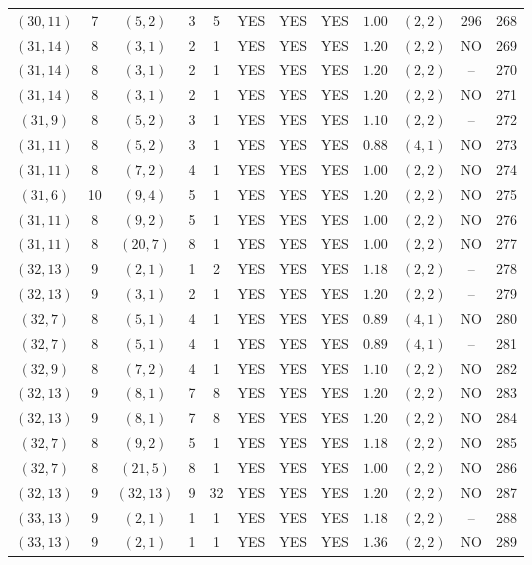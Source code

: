 \begin{longtable}{|c|c|c|c|c|c|c|c|c|c|c|c|}
$(30,11)$ & 7 & $(5,2)$ & 3 & 5 & YES & YES & YES & $1.00$ & $(2,2)$ & 296 & 268\\
$(31,14)$ & 8 & $(3,1)$ & 2 & 1 & YES & YES & YES & $1.20$ & $(2,2)$ & NO & 269\\
$(31,14)$ & 8 & $(3,1)$ & 2 & 1 & YES & YES & YES & $1.20$ & $(2,2)$ & -- & 270\\
$(31,14)$ & 8 & $(3,1)$ & 2 & 1 & YES & YES & YES & $1.20$ & $(2,2)$ & NO & 271\\
$(31,9)$ & 8 & $(5,2)$ & 3 & 1 & YES & YES & YES & $1.10$ & $(2,2)$ & -- & 272\\
$(31,11)$ & 8 & $(5,2)$ & 3 & 1 & YES & YES & YES & $0.88$ & $(4,1)$ & NO & 273\\
$(31,11)$ & 8 & $(7,2)$ & 4 & 1 & YES & YES & YES & $1.00$ & $(2,2)$ & NO & 274\\
$(31,6)$ & 10 & $(9,4)$ & 5 & 1 & YES & YES & YES & $1.20$ & $(2,2)$ & NO & 275\\
$(31,11)$ & 8 & $(9,2)$ & 5 & 1 & YES & YES & YES & $1.00$ & $(2,2)$ & NO & 276\\
$(31,11)$ & 8 & $(20,7)$ & 8 & 1 & YES & YES & YES & $1.00$ & $(2,2)$ & NO & 277\\
$(32,13)$ & 9 & $(2,1)$ & 1 & 2 & YES & YES & YES & $1.18$ & $(2,2)$ & -- & 278\\
$(32,13)$ & 9 & $(3,1)$ & 2 & 1 & YES & YES & YES & $1.20$ & $(2,2)$ & -- & 279\\
$(32,7)$ & 8 & $(5,1)$ & 4 & 1 & YES & YES & YES & $0.89$ & $(4,1)$ & NO & 280\\
$(32,7)$ & 8 & $(5,1)$ & 4 & 1 & YES & YES & YES & $0.89$ & $(4,1)$ & -- & 281\\
$(32,9)$ & 8 & $(7,2)$ & 4 & 1 & YES & YES & YES & $1.10$ & $(2,2)$ & NO & 282\\
$(32,13)$ & 9 & $(8,1)$ & 7 & 8 & YES & YES & YES & $1.20$ & $(2,2)$ & NO & 283\\
$(32,13)$ & 9 & $(8,1)$ & 7 & 8 & YES & YES & YES & $1.20$ & $(2,2)$ & NO & 284\\
$(32,7)$ & 8 & $(9,2)$ & 5 & 1 & YES & YES & YES & $1.18$ & $(2,2)$ & NO & 285\\
$(32,7)$ & 8 & $(21,5)$ & 8 & 1 & YES & YES & YES & $1.00$ & $(2,2)$ & NO & 286\\
$(32,13)$ & 9 & $(32,13)$ & 9 & 32 & YES & YES & YES & $1.20$ & $(2,2)$ & NO & 287\\
$(33,13)$ & 9 & $(2,1)$ & 1 & 1 & YES & YES & YES & $1.18$ & $(2,2)$ & -- & 288\\
$(33,13)$ & 9 & $(2,1)$ & 1 & 1 & YES & YES & YES & $1.36$ & $(2,2)$ & NO & 289\\

\end{longtable}
